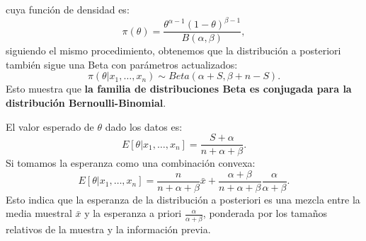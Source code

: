 {  cuya función de densidad es:
  \[
    \pi(\theta) = \frac{\theta^{\alpha - 1} (1-\theta)^{\beta - 1}}{B(\alpha, \beta)},
  \]
  siguiendo el mismo procedimiento, obtenemos que la distribución a posteriori
  también sigue una Beta con parámetros actualizados:
  \[
    \pi(\theta | x_1, \dots, x_n) \sim Beta(\alpha + S, \beta + n - S).
  \]
  Esto muestra que \textbf{la familia de distribuciones Beta es conjugada para la
    distribución Bernoulli-Binomial}.

  El valor esperado de \( \theta \) dado los datos es:
  \[
    E[\theta | x_1, \dots, x_n] = \frac{S + \alpha}{n + \alpha + \beta}.
  \]
  Si tomamos la esperanza como una combinación convexa:
  \[
    E[\theta | x_1, \dots, x_n] = \frac{n}{n + \alpha + \beta} \bar{x} + \frac{\alpha + \beta}{n + \alpha + \beta} \frac{\alpha}{\alpha + \beta}.
  \]
  Esto indica que la esperanza de la distribución a posteriori es una mezcla
  entre la media muestral \( \bar{x} \) y la esperanza a priori \(
  \frac{\alpha}{\alpha + \beta} \), ponderada por los tamaños relativos de la
  muestra y la información previa. }

